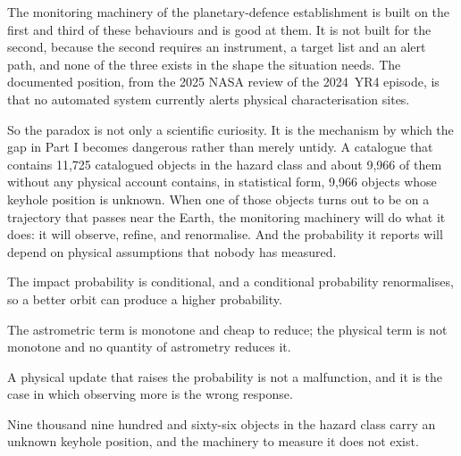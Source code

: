 The monitoring machinery of the planetary-defence establishment is built on
the first and third of these behaviours and is good at them. It is not
built for the second, because the second requires an instrument, a target
list and an alert path, and none of the three exists in the shape the
situation needs. The documented position, from the 2025 NASA review of the
2024~YR4 episode, is that no automated system currently alerts physical
characterisation sites.

So the paradox is not only a scientific curiosity. It is the mechanism by
which the gap in Part I becomes dangerous rather than merely untidy. A
catalogue that contains 11,725 catalogued objects in the hazard class and
about 9,966 of them without any physical account contains, in statistical
form, 9,966 objects whose keyhole position is unknown. When one of those
objects turns out to be on a trajectory that passes near the Earth, the
monitoring machinery will do what it does: it will observe, refine, and
renormalise. And the probability it reports will depend on physical
assumptions that nobody has measured.

\begin{keytakeaways}
\item The impact probability is conditional, and a conditional probability
renormalises, so a better orbit can produce a higher probability.
\item The astrometric term is monotone and cheap to reduce; the physical
term is not monotone and no quantity of astrometry reduces it.
\item A physical update that raises the probability is not a malfunction,
and it is the case in which observing more is the wrong response.
\item Nine thousand nine hundred and sixty-six objects in the hazard class
carry an unknown keyhole position, and the machinery to measure it does not
exist.
\end{keytakeaways}

